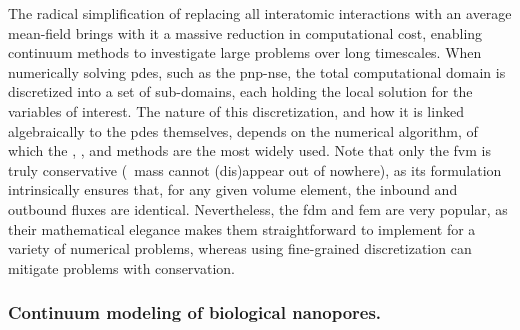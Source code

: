 The radical simplification of replacing all interatomic interactions with an average mean-field brings with it a
massive reduction in computational cost, enabling continuum methods to investigate large problems over long
timescales. When numerically solving \glspl{pde}, such as the \gls{pnp-nse}, the total computational domain is
discretized into a set of sub-domains, each holding the local solution for the variables of interest. The
nature of this discretization, and how it is linked algebraically to the \glspl{pde} themselves, depends on
the numerical algorithm, of which the , , and  methods are the most widely used. Note that only the
\gls{fvm} is truly conservative (\ie~mass cannot (dis)appear out of nowhere), as its formulation intrinsically
ensures that, for any given volume element, the inbound and outbound fluxes are identical. Nevertheless, the
\gls{fdm} and \gls{fem} are very popular, as their mathematical elegance makes them straightforward to
implement for a variety of numerical problems, whereas using fine-grained discretization can mitigate problems
with conservation.


\subsubsection{Continuum modeling of biological nanopores.}
%

